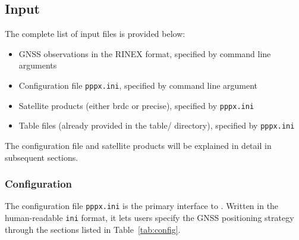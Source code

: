 \subsection{Input}
\label{sec:input}

The complete list of input files is provided below:
\begin{itemize}
    \item GNSS observations in the RINEX format, specified by command line arguments
    \item Configuration file \texttt{pppx.ini}, specified by command line argument
    \item Satellite products (either brdc or precise), specified by \texttt{pppx.ini}
    \item Table files (already provided in the table/ directory), specified by \texttt{pppx.ini}
\end{itemize}

The configuration file and satellite products will be explained in detail in subsequent sections.



\subsubsection{Configuration}
\label{sec:input_configuration}

The configuration file \texttt{pppx.ini} is the primary interface to \pppx{}.
Written in the human-readable \texttt{ini} format, it lets users specify the GNSS positioning
strategy through the sections listed in Table~\ref{tab:config}.

\begin{table}[!hbt]
    \centering
    \caption{Available sections of the configuration file \texttt{pppx.ini}.}
    \label{tab:config}
\end{table}

